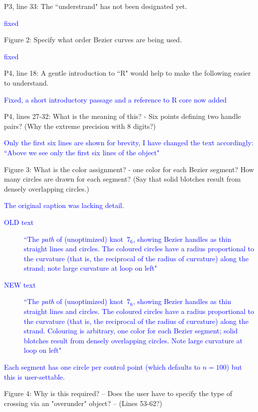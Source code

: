 \documentclass[12pt]{article}
\begin{document}
P3, line 33:  The ``understrand" has not been designated yet.

\textcolor{blue}{fixed}%

Figure 2:  Specify what order Bezier curves are being used.

\textcolor{blue}{fixed}%

P4, line 18: A gentle introduction to ``R" would help to make the
following easier to understand.

\textcolor{blue}{Fixed, a short introductory passage and a reference
  to R core now added}%

P4, lines 27-32: What is the meaning of this? - Six points defining
two handle pairs?  (Why the extreme precision with 8 digits?)

\textcolor{blue}{Only the first six lines are shown for brevity, I have
  changed the text accordingly: ``Above we see only the first six lines
of the object"}


Figure 3: What is the color assignment? - one color for each Bezier
segment?  How many circles are drawn for each segment?  (Say that
solid blotches result from densely overlapping circles.)

\textcolor{blue}{The original caption was lacking detail.
  \begin{description}
  \item[OLD text] ``The \emph{path} of (unoptimized) knot~$7_6$,
    showing Bezier handles as thin straight lines and circles.  The
    coloured circles have a radius proportional to the curvature (that
    is, the reciprocal of the radius of curvature) along the strand;
    note large curvature at loop on left"
  \item[NEW text] ``The \emph{path} of (unoptimized) knot~$7_6$,
    showing Bezier handles as thin straight lines and circles.  The
    coloured circles have a radius proportional to the curvature (that
    is, the reciprocal of the radius of curvature) along the strand.
    Colouring is arbitrary, one color for each Bezier segment; solid
    blotches result from densely overlapping circles.  Note large
    curvature at loop on left"
  \end{description}
  Each segment has one circle per control point (which defaults to
  $n=100$) but this is user-settable.
}



Figure 4: Why is this required?  -- Does the user have to specify the
type of crossing via an "overunder" object?  -- (Lines 53-62?)
\end{document}

